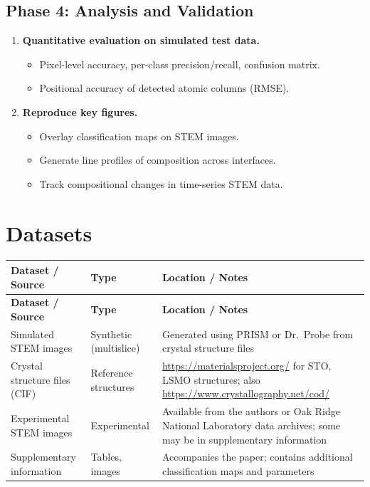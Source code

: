 \documentclass[11pt,a4paper]{article}
\begin{document}
\subsection{Phase 4: Analysis and Validation}
\begin{enumerate}[label=\textbf{4.\arabic*}]
  \item \textbf{Quantitative evaluation on simulated test data.}
    \begin{itemize}
      \item Pixel-level accuracy, per-class precision/recall, confusion matrix.
      \item Positional accuracy of detected atomic columns (RMSE).
    \end{itemize}
  \item \textbf{Reproduce key figures.}
    \begin{itemize}
      \item Overlay classification maps on STEM images.
      \item Generate line profiles of composition across interfaces.
      \item Track compositional changes in time-series STEM data.
    \end{itemize}
\end{enumerate}

\section{Datasets}

\begin{longtable}{p{4.5cm} p{3.5cm} p{6cm}}
\toprule
\textbf{Dataset / Source} & \textbf{Type} & \textbf{Location / Notes} \\
\midrule
\endfirsthead
\toprule
\textbf{Dataset / Source} & \textbf{Type} & \textbf{Location / Notes} \\
\midrule
\endhead
Simulated STEM images & Synthetic (multislice) & Generated using PRISM or Dr.\ Probe from crystal structure files \\
\midrule
Crystal structure files (CIF) & Reference structures & \url{https://materialsproject.org/} for STO, LSMO structures; also \url{https://www.crystallography.net/cod/} \\
\midrule
Experimental STEM images & Experimental & Available from the authors or Oak Ridge National Laboratory data archives; some may be in supplementary information \\
\midrule
Supplementary information & Tables, images & Accompanies the paper; contains additional classification maps and parameters \\
\bottomrule
\end{longtable}
\end{document}
